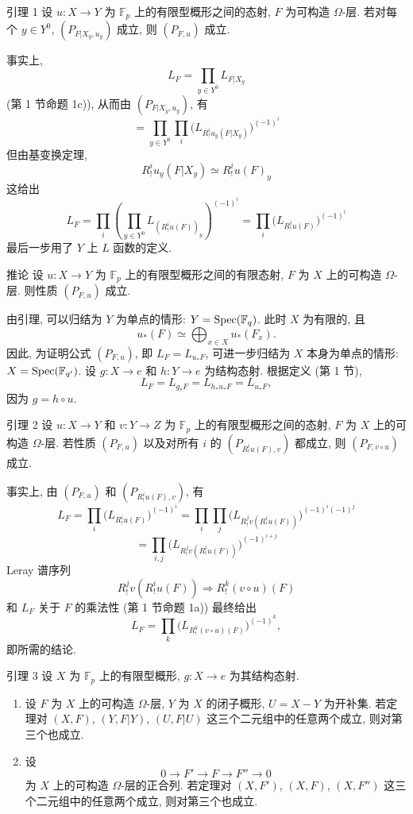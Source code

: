 \begin{statement}{引理 1}
设 $u:X\to Y$ 为 $\mathbb F_p$ 上的有限型概形之间的态射, $F$ 为可构造 $\Omega$-层. 若对每个 $y\in Y^0$, $(P_{F|X_y,u_y})$ 成立, 则 $(P_{F,u})$ 成立.
\end{statement}

事实上,
\[
L_F=\prod_{y\in Y^0}L_{F|X_y}
\]
(第 1 节命题 1c)), 从而由 $(P_{F|X_y,u_y})$, 有
\[
=\prod_{y\in Y^0}\prod_i\bigl(L_{R^i_!u_y(F|X_y)}\bigr)^{(-1)^i}
\]
但由基变换定理,
\[
R^i_!u_y(F|X_y)\simeq R^i_!u(F)_y
\]
这给出
\[
L_F=\prod_i\left(\prod_{y\in Y^0}L_{(R^i_!u(F))_y}\right)^{(-1)^i}
=\prod_i\bigl(L_{R^i_!u(F)}\bigr)^{(-1)^i}
\]
最后一步用了 $Y$ 上 $L$ 函数的定义.

\begin{statement}{推论}
设 $u:X\to Y$ 为 $\mathbb F_p$ 上的有限型概形之间的有限态射, $F$ 为 $X$ 上的可构造 $\Omega$-层. 则性质 $(P_{F,u})$ 成立.
\end{statement}

由引理, 可以归结为 $Y$ 为单点的情形: $Y=\operatorname{Spec}(\mathbb F_q)$. 此时 $X$ 为有限的, 且
\[
u_*(F)\simeq \bigoplus_{x\in X}u_*(F_x).
\]
因此, 为证明公式 $(P_{F,u})$, 即 $L_F=L_{u_*F}$, 可进一步归结为 $X$ 本身为单点的情形: $X=\operatorname{Spec}(\mathbb F_{q'})$. 设 $g:X\to e$ 和 $h:Y\to e$ 为结构态射. 根据定义 (第 1 节),
\[
L_F=L_{g_*F}=L_{h_*u_*F}=L_{u_*F},
\]
因为 $g=h\circ u$.

\begin{statement}{引理 2}
设 $u:X\to Y$ 和 $v:Y\to Z$ 为 $\mathbb F_p$ 上的有限型概形之间的态射, $F$ 为 $X$ 上的可构造 $\Omega$-层. 若性质 $(P_{F,u})$ 以及对所有 $i$ 的 $(P_{R^i_!u(F),v})$ 都成立, 则 $(P_{F,v\circ u})$ 成立.
\end{statement}

事实上, 由 $(P_{F,u})$ 和 $(P_{R^i_!u(F),v})$, 有
\[
L_F=\prod_i\bigl(L_{R^i_!u(F)}\bigr)^{(-1)^i}
 =\prod_i\prod_j\bigl(L_{R^j_!v(R^i_!u(F))}\bigr)^{(-1)^i(-1)^j}
\]
\[
=\prod_{i,j}\bigl(L_{R^j_!v(R^i_!u(F))}\bigr)^{(-1)^{i+j}}
\]
Leray 谱序列
\[
R^j_!v(R^i_!u(F))\Longrightarrow R^k_!(v\circ u)(F)
\]
和 $L_F$ 关于 $F$ 的乘法性 (第 1 节命题 1a)) 最终给出
\[
L_F=\prod_k\bigl(L_{R^k_!(v\circ u)(F)}\bigr)^{(-1)^k},
\]
即所需的结论.

\begin{statement}{引理 3}
设 $X$ 为 $\mathbb F_p$ 上的有限型概形, $g:X\to e$ 为其结构态射.
\begin{enumerate}[label=\alph*)]
\item 设 $F$ 为 $X$ 上的可构造 $\Omega$-层, $Y$ 为 $X$ 的闭子概形, $U=X-Y$ 为开补集. 若定理对 $(X,F)$, $(Y,F|Y)$, $(U,F|U)$ 这三个二元组中的任意两个成立, 则对第三个也成立.
\item 设
\[
0\longrightarrow F'\longrightarrow F\longrightarrow F''\longrightarrow0
\]
为 $X$ 上的可构造 $\Omega$-层的正合列. 若定理对 $(X,F')$, $(X,F)$, $(X,F'')$ 这三个二元组中的任意两个成立, 则对第三个也成立.
\end{enumerate}
\end{statement}

